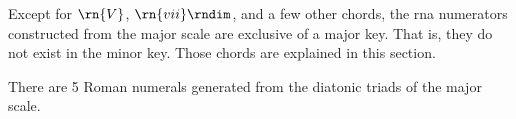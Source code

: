 
Except for $\rn{V}$, $\rn{vii}\rndim$, and a few other
chords, the \gls{rna} numerators constructed from the major
scale are exclusive of a major key. That is, they do not
exist in the minor key. Those chords are explained in this
section.


There are 5 Roman numerals generated from the diatonic
triads of the major scale. 
